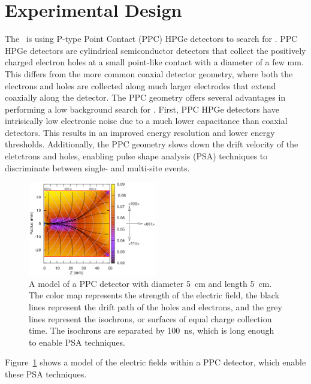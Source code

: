 \documentclass[/main.tex]{subfiles}
\begin{document}
\section{Experimental Design}
The \MJD\ is using P-type Point Contact (PPC)\cite{Luke1989, Barbeau2007} HPGe detectors to search for \znbb.
PPC HPGe detectors are cylindrical semiconductor detectors that collect the positively charged electron holes at a small point-like contact with a diameter of a few mm.
This differs from the more common coaxial detector geometry, where both the electrons and holes are collected along much larger electrodes that extend coaxially along the detector.
The PPC geometry offers several advantages in performing a low background search for \znbb.
First, PPC HPGe detectors have intrisically low electronic noise due to a much lower capacitance than coaxial detectors.
This results in an improved energy resolution and lower energy thresholds.
Additionally, the PPC geometry slows down the drift velocity of the eletctrons and holes, enabling pulse shape analysis (PSA) techniques to discriminate between single- and multi-site events.
\begin{figure}[h]
  \centering
  \includegraphics[width=0.5\textwidth]{ppcfieldmodel}
  \caption[Electric field model of a PPC detector]{\label{fig:ppcdet}
    A model of a PPC detector with diameter 5~cm and length 5~cm. The color map represents the strength of the electric field, the black lines represent the drift path of the holes and electrons, and the grey lines represent the isochrons, or surfaces of equal charge collection time. The isochrons are separated by 100~ns, which is long enough to enable PSA techniques.
  }
\end{figure}
Figure~\ref{fig:ppcdet} shows a model of the electric fields within a PPC detector, which enable these PSA techniques.
\\
\end{document}
